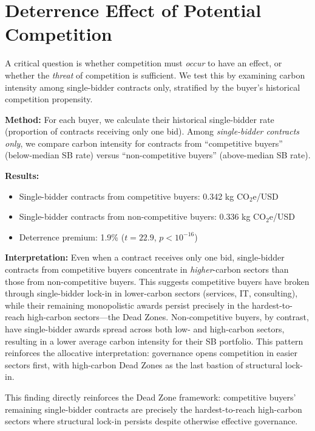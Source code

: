 \documentclass[11pt]{article}
\begin{document}
\section{Deterrence Effect of Potential Competition}

A critical question is whether competition must \textit{occur} to have an effect, or whether the \textit{threat} of competition is sufficient. We test this by examining carbon intensity among single-bidder contracts only, stratified by the buyer's historical competition propensity.

\textbf{Method:} For each buyer, we calculate their historical single-bidder rate (proportion of contracts receiving only one bid). Among \textit{single-bidder contracts only}, we compare carbon intensity for contracts from ``competitive buyers'' (below-median SB rate) versus ``non-competitive buyers'' (above-median SB rate).

\textbf{Results:}
\begin{itemize}
    \item Single-bidder contracts from competitive buyers: 0.342 kg CO$_2$e/USD
    \item Single-bidder contracts from non-competitive buyers: 0.336 kg CO$_2$e/USD
    \item Deterrence premium: 1.9\% ($t = 22.9$, $p < 10^{-16}$)
\end{itemize}

\textbf{Interpretation:} Even when a contract receives only one bid, single-bidder contracts from competitive buyers concentrate in \textit{higher}-carbon sectors than those from non-competitive buyers. This suggests competitive buyers have broken through single-bidder lock-in in lower-carbon sectors (services, IT, consulting), while their remaining monopolistic awards persist precisely in the hardest-to-reach high-carbon sectors---the Dead Zones. Non-competitive buyers, by contrast, have single-bidder awards spread across both low- and high-carbon sectors, resulting in a lower average carbon intensity for their SB portfolio. This pattern reinforces the allocative interpretation: governance opens competition in easier sectors first, with high-carbon Dead Zones as the last bastion of structural lock-in.

This finding directly reinforces the Dead Zone framework: competitive buyers' remaining single-bidder contracts are precisely the hardest-to-reach high-carbon sectors where structural lock-in persists despite otherwise effective governance.
\end{document}
